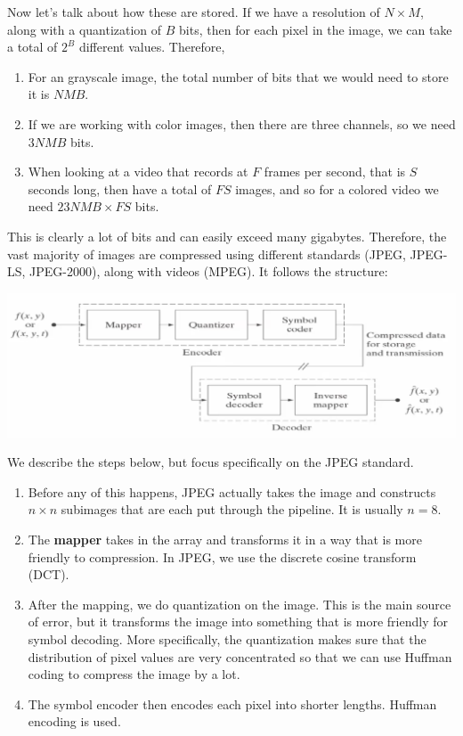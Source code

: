 \documentclass{article}
\begin{document}
    Now let's talk about how these are stored. If we have a resolution of $N \times M$, along with a quantization of $B$ bits, then for each pixel in the image, we can take a total of $2^B$ different values. Therefore, 
    \begin{enumerate}
        \item For an grayscale image, the total number of bits that we would need to store it is $NMB$. 
        \item If we are working with color images, then there are three channels, so we need $3NMB$ bits. 
        \item When looking at a video that records at $F$ frames per second, that is $S$ seconds long, then have a total of $FS$ images, and so for a colored video we need $23NMB \times FS$ bits. 
    \end{enumerate}
    This is clearly a lot of bits and can easily exceed many gigabytes. Therefore, the vast majority of images are compressed using different standards (JPEG, JPEG-LS, JPEG-2000), along with videos (MPEG). It follows the structure: 
    \begin{center}
        \includegraphics[scale=0.27]{img/JPEG.png}
    \end{center}
    We describe the steps below, but focus specifically on the JPEG standard. 
    \begin{enumerate}
        \item Before any of this happens, JPEG actually takes the image and constructs $n \times n$ subimages that are each put through the pipeline. It is usually $n = 8$. 
        \item The \textbf{mapper} takes in the array and transforms it in a way that is more friendly to compression. In JPEG, we use the discrete cosine transform (DCT). 
        \item After the mapping, we do quantization on the image. This is the main source of error, but it transforms the image into something that is more friendly for symbol decoding. More specifically, the quantization makes sure that the distribution of pixel values are very concentrated so that we can use Huffman coding to compress the image by a lot. 
        \item The symbol encoder then encodes each pixel into shorter lengths. Huffman encoding is used. 
    \end{enumerate}
\end{document}
